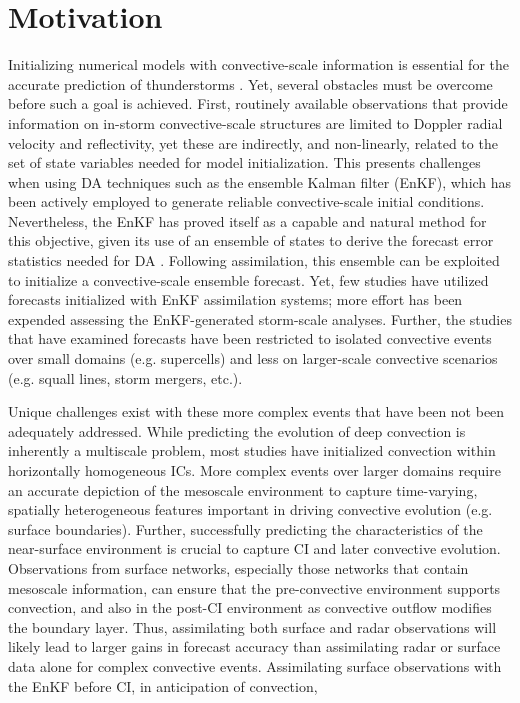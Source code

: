 \chapter{Motivation}
Initializing numerical models with convective-scale information is essential for the accurate prediction of thunderstorms \citep{lilly90}. Yet, several obstacles must be overcome before such a goal is achieved. First, routinely available observations that provide information on in-storm convective-scale structures are limited to Doppler radial velocity and reflectivity, yet these are indirectly, and non-linearly, related to the set of state variables needed for model initialization. This presents challenges when using DA techniques such as the ensemble Kalman filter (EnKF), which has been actively employed to generate reliable convective-scale initial conditions. Nevertheless, the EnKF has proved itself as a capable and natural method for this objective, given its use of an ensemble of states to derive the forecast error statistics needed for DA \citep{snyderzhang03}. Following assimilation, this ensemble can be exploited to initialize a convective-scale ensemble forecast. Yet, few studies have utilized forecasts initialized with EnKF assimilation systems; more effort has been expended assessing the EnKF-generated storm-scale analyses. Further, the studies that have examined forecasts have been restricted to isolated convective events over small domains (e.g. supercells) and less on larger-scale convective scenarios (e.g. squall lines, storm mergers, etc.). 

Unique challenges exist with these more complex events that have been not been adequately addressed. While predicting the evolution of deep convection is inherently a multiscale problem, most studies have initialized convection within horizontally homogeneous ICs. More complex events over larger domains require an accurate depiction of the mesoscale environment to capture time-varying, spatially heterogeneous features important in driving convective evolution (e.g. surface boundaries). Further, successfully predicting the characteristics of the near-surface environment is crucial to capture CI and later convective evolution. Observations from surface networks, especially those networks that contain mesoscale information, can ensure that the pre-convective environment supports convection, and also in the post-CI environment as convective outflow modifies the boundary layer. Thus, assimilating both surface and radar observations will likely lead to larger gains in forecast accuracy than assimilating radar or surface data alone for complex convective events. Assimilating surface observations with the EnKF before CI, in anticipation of convection, 

